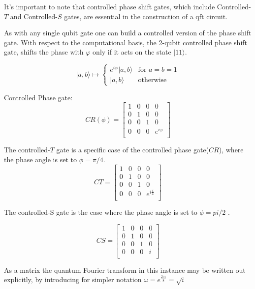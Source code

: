 \documentclass[inscr,ack,preface]{diphdthesis}
\begin{document}
It's important to note that controlled phase shift gates, which include Controlled-$T$ and Controlled-$S$ gates, are essential in the construction of a \acrshort{qft} circuit.

As with any single \acrshort{qubit} gate one can build a controlled version of the phase shift gate. With respect to the computational basis, the 2-\acrshort{qubit} controlled phase shift gate, shifts the phase with $\varphi$ only if it acts on the state $|11\rangle$\cite{cphase}.

\[
|a,b\rangle \mapsto
\begin{cases}
e^{i\varphi}|a,b\rangle & \text{for } a=b=1 \\
|a,b\rangle & \text{otherwise}
\end{cases}
\]

Controlled Phase gate:
\[
\text{$CR(\phi)$} =
\begin{bmatrix}
    1 & 0 & 0 & 0 \\
    0 & 1 & 0 & 0 \\
    0 & 0 & 1 & 0 \\
    0 & 0 & 0 & e^{i\varphi} \\
\end{bmatrix}
\]

The controlled-$T$ gate is a specific case of the controlled phase gate($CR$), where the phase angle is set to $\phi = \pi/ 4 $.
\[
\text{$CT$} =
\begin{bmatrix}
    1 & 0 & 0 & 0 \\
    0 & 1 & 0 & 0 \\
    0 & 0 & 1 & 0 \\
    0 & 0 & 0 & e^{i\frac{\pi}{4}} \\
\end{bmatrix}
\]

The controlled-S gate is the case where the phase angle is set to $\phi = pi / 2 $ \cite{niel}.

\[
\text{$CS$} =
\begin{bmatrix}
    1 & 0 & 0 & 0 \\
    0 & 1 & 0 & 0 \\
    0 & 0 & 1 & 0 \\
    0 & 0 & 0 & i \\
\end{bmatrix}
\]






As a matrix the quantum Fourier transform in this instance may be written out explicitly, by introducing for simpler notation \Large$\omega= e^{\frac{2\pi i}{8}} = \sqrt{i}$ \normalsize \cite{niel}
\end{document}
